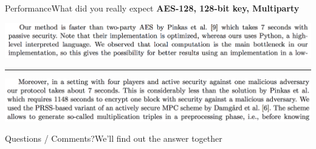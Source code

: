 \documentclass[12pt]{beamer}
\begin{document}
\begin{frame}{Performance}{What did you really expect}
	\textbf{AES-128, 128-bit key, Multiparty}

	\includegraphics[width=\textwidth]{./pictures/smp-aes-2-performance1}

	\vspace{1em}
	\hrule
	\vspace{1em}

	\includegraphics[width=\textwidth]{./pictures/smp-aes-2-performance2}
	
\end{frame}

\begin{frame}{Questions / Comments?}{We'll find out the answer together}
\end{frame}
\end{document}
